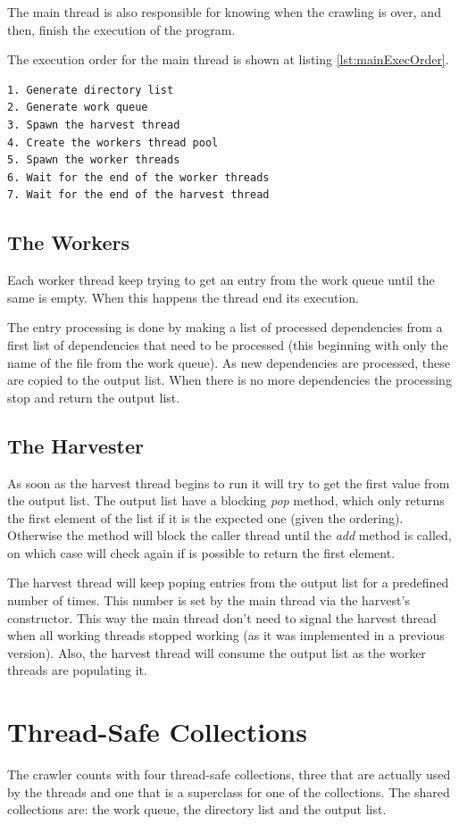 \documentclass[twocolumn,20pt]{article}
\begin{document}
The main thread is also responsible for knowing when the crawling is over, and then, finish the execution of the program.

The execution order for the main thread is shown at listing \ref{lst:mainExecOrder}.

\begin{lstlisting}[caption={Main thread execution order}, label=lst:mainExecOrder]
1. Generate directory list
2. Generate work queue
3. Spawn the harvest thread
4. Create the workers thread pool
5. Spawn the worker threads
6. Wait for the end of the worker threads
7. Wait for the end of the harvest thread
\end{lstlisting}

\subsection{The Workers}
Each worker thread keep trying to get an entry from the work queue until the same is empty. When this happens the thread end its execution.

The entry processing is done by making a list of processed dependencies from a first list of dependencies that need to be processed (this beginning with only the name of the file from the work queue). As new dependencies are processed, these are copied to the output list. When there is no more dependencies the processing stop and return the output list.

\subsection{The Harvester}
As soon as the harvest thread begins to run it will try to get the first value from the output list. The output list have a blocking \textit{pop} method, which only returns the first element of the list if it is the expected one (given the ordering). Otherwise the method will block the caller thread until the \textit{add} method is called, on which case will check again if is possible to return the first element.

The harvest thread will keep poping entries from the output list for a predefined number of times. This number is set by the main thread via the harvest's constructor. This way the main thread don't need to signal the harvest thread when all working threads stopped working (as it was implemented in a previous version). Also, the harvest thread will consume the output list as the worker threads are populating it.

\section{Thread-Safe Collections}
The crawler counts with four thread-safe collections, three that are actually used by the threads and one that is a superclass for one of the collections. The shared collections are: the work queue, the directory list and the output list.
\end{document}
